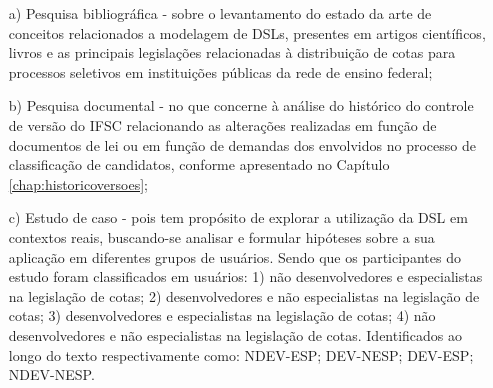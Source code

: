 \begin{enumerate}
    \item[a)] Pesquisa bibliográfica - sobre o levantamento do estado da arte de conceitos relacionados a modelagem de \gls{DSL}s, presentes em artigos científicos, livros e as principais legislações relacionadas à distribuição de cotas para processos seletivos em instituições públicas da rede de ensino federal;
    
    \item[b)] Pesquisa documental - no que concerne à análise do histórico do controle de versão do \gls{IFSC} relacionando as alterações realizadas em função de documentos de lei ou em função de demandas dos envolvidos no processo de classificação de candidatos, conforme apresentado no Capítulo \ref{chap:historicoversoes};
    
    \item[c)] Estudo de caso - pois tem propósito de explorar a utilização da DSL em contextos reais, buscando-se analisar e formular hipóteses sobre a sua aplicação em diferentes grupos de usuários. Sendo que os participantes do estudo foram classificados em usuários: 1) não desenvolvedores e especialistas na legislação de cotas; 2) desenvolvedores e não especialistas na legislação de cotas; 3) desenvolvedores e especialistas na legislação de cotas; 4) não desenvolvedores e não especialistas na legislação de cotas. Identificados ao longo do texto respectivamente como: NDEV-ESP; DEV-NESP; DEV-ESP; NDEV-NESP.  
    
\end{enumerate}
